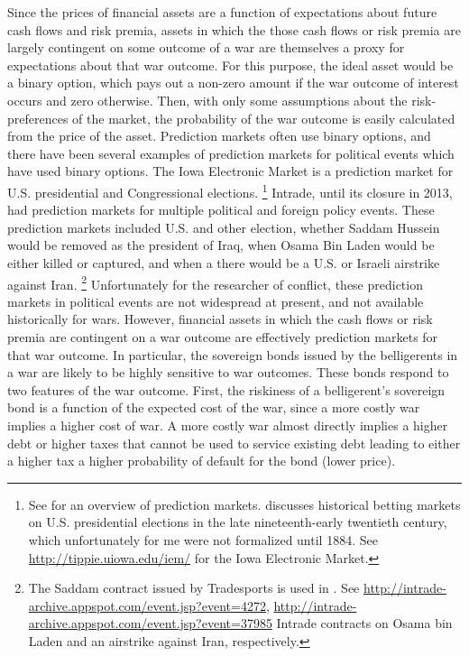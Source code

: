 Since the prices of financial assets are a function of expectations about future cash flows and risk premia, assets in which the those cash flows or risk premia are largely contingent on some outcome of a war are themselves a proxy for expectations about that war outcome.
For this purpose, the ideal asset would be a binary option, which pays out a non-zero amount if the war outcome of interest occurs and zero otherwise.
Then, with only some assumptions about the risk-preferences of the market, the probability of the war outcome is easily calculated from the price of the asset.
Prediction markets often use binary options, and there have been several examples of prediction markets for political events which have used binary options.
The Iowa Electronic Market is a prediction market for U.S. presidential and Congressional elections.%
\footnote{
  See \textcite{WolfersZitzewitz2004} for an overview of prediction markets.
  \textcite{RhodeStrumpf2004a} discusses historical betting markets on U.S. presidential elections in the late nineteenth-early twentieth century, which unfortunately for me were not formalized until 1884.
  See \url{http://tippie.uiowa.edu/iem/} for the Iowa Electronic Market.
}
Intrade, until its closure in 2013, had prediction markets for multiple political and foreign policy events.
These prediction markets included U.S. and other election, whether Saddam Hussein would be removed as the president of Iraq, when Osama Bin Laden would be either killed or captured, and when a there would be a U.S. or Israeli airstrike against Iran.%
\footnote{
  The Saddam contract issued by Tradesports is used in \textcite{LeighWolfersEtAl2003}.
  See \url{http://intrade-archive.appspot.com/event.jsp?event=4272}, \url{http://intrade-archive.appspot.com/event.jsp?event=37985} Intrade contracts on Osama bin Laden and an airstrike against Iran, respectively.
}
Unfortunately for the researcher of conflict, these prediction markets in political events are not widespread at present, and not available historically for wars.
However, financial assets in which the cash flows or risk premia are contingent on a war outcome are effectively prediction markets for that war outcome.
In particular, the sovereign bonds issued by the belligerents in a war are likely to be highly sensitive to war outcomes.
These bonds respond to two features of the war outcome.
First, the riskiness of a belligerent's sovereign bond is a function of the expected cost of the war, since a more costly war implies a higher cost of war.
A more costly war almost directly implies a higher debt or higher taxes that cannot be used to service existing debt leading to either a higher tax  a higher probability of default for the bond (lower price).
